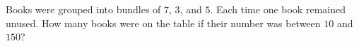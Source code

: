 Books were grouped into bundles of $7$, $3$, and $5$. Each time one book remained unused. How many books were on the table if their number was between $10$ and $150$?
